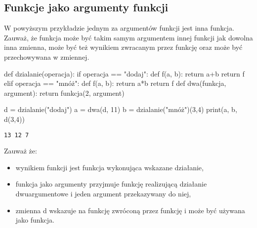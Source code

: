 \subsection{Funkcje jako argumenty funkcji }\label{Funkcje_jako_argumenty}

W powyższym przykładzie jednym za argumentów funkcji  jest inna funkcja.
Zauważ, że funkcja może być takim samym argumentem innej funkcji jak dowolna inna zmienna,
może być też wynikiem zwracanym przez funkcję oraz może być przechowywana w zmiennej.

\begin{CodeFrame}[python]{0.50\textwidth}
def dzialanie(operacja):
    if operacja == "dodaj":
        def f(a, b):
            return a+b
        return f
    elif operacja == "mnóż":
        def f(a, b):
            return a*b
        return f
def dwa(funkcja, argument):
    return funkcja(2, argument)

d = dzialanie("dodaj")
a = dwa(d, 11)
b = dzialanie("mnóż")(3,4)
print(a, b, d(3,4))
\end{CodeFrame}
\begin{minipage}[t]{0.46\textwidth}
\begin{Verbatim}[frame=single]
13 12 7
\end{Verbatim}

\vspace{6pt}\noindent Zauważ że:
\begin{itemize}[leftmargin=7mm]
\item wynikiem funkcji  jest funkcja wykonująca wskazane działanie,
\item funkcja  jako argumenty przyjmuje funkcję realizującą działanie dwuargumentowe i jeden argument przekazywany do niej,
\item zmienna d wskazuje na funkcję zwróconą przez funkcję  i może być używana jako funkcja.
\end{itemize}
\end{minipage}

